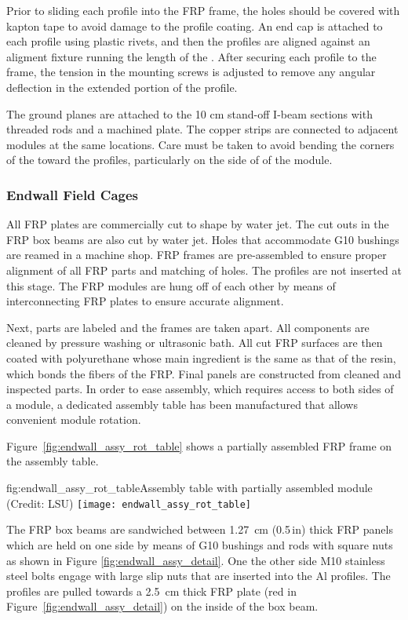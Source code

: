 Prior to sliding each profile into the FRP frame, the holes should be covered with kapton tape to avoid damage to the profile coating. An end cap is attached to each profile using plastic rivets, and then the profiles are aligned against an aligment fixture running the length of the . After securing each profile to the frame, the tension in the mounting screws is adjusted to remove any angular deflection in the extended portion of the profile.

The ground planes are attached to the 10 cm stand-off I-beam sections with threaded rods and a machined plate. The copper strips are connected to adjacent modules at the same locations. Care must be taken to avoid bending the corners of the  toward the profiles, particularly on the  side of of the module.


\subsubsection{Endwall Field Cages}

All FRP plates are commercially cut to shape by water jet. The cut outs in the FRP box beams are also cut by water jet. Holes that accommodate G10 bushings are reamed in a machine shop. FRP frames are pre-assembled to ensure proper alignment of all FRP parts and matching of holes. The profiles are not inserted at this stage. The FRP modules are hung off of each other by means of interconnecting FRP plates to ensure accurate alignment.

Next, parts are labeled and the frames are taken apart. All components are cleaned by pressure washing or ultrasonic bath. All cut FRP surfaces are then coated with polyurethane whose main ingredient is the same as that of the resin, which bonds
the fibers of the FRP. Final panels are constructed from cleaned and inspected parts. In order to ease assembly, which requires access to both sides of a module,
a dedicated assembly table has been manufactured that allows convenient module rotation. 

Figure~\ref{fig:endwall_assy_rot_table} shows a partially assembled  FRP frame on the assembly table.
\begin{dunefigure}{fig:endwall_assy_rot_table}{Assembly table with partially assembled  module (Credit: LSU)}
 \texttt{[image: endwall\_assy\_rot\_table]}
 \end{dunefigure}


The FRP box beams are sandwiched between \SI{1.27}{\cm} (\num{0.5}\,in) thick FRP panels which are held on one side by means of G10 bushings and rods with square nuts
as shown in Figure \ref{fig:endwall_assy_detail}. One the other side M10 stainless steel bolts engage with large slip nuts that are inserted into the Al profiles. The profiles 
are pulled towards a \SI{2.5}{\cm} thick FRP plate (red in Figure~\ref{fig:endwall_assy_detail}) on the inside of the box beam.
%

